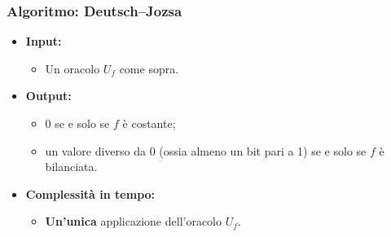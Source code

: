 \documentclass[a4paper,12pt]{report}
\theoremstyle{plain}
\begin{document}
\subsubsection*{Algoritmo: Deutsch--Jozsa}
\begin{itemize}
    \item \textbf{Input:}
    \begin{itemize}
        \item Un oracolo $U_f$ come sopra.
    \end{itemize}
    
    \item \textbf{Output:}
    \begin{itemize}
        \item $0$ se e solo se $f$ è costante;
        \item un valore diverso da $0$ (ossia almeno un bit pari a 1) se e solo se $f$ è bilanciata.
    \end{itemize}
    
    \item \textbf{Complessità in tempo:}
    \begin{itemize}
        \item \textbf{Un'unica} applicazione dell'oracolo $U_f$.
    \end{itemize}
\end{itemize}
\end{document}
